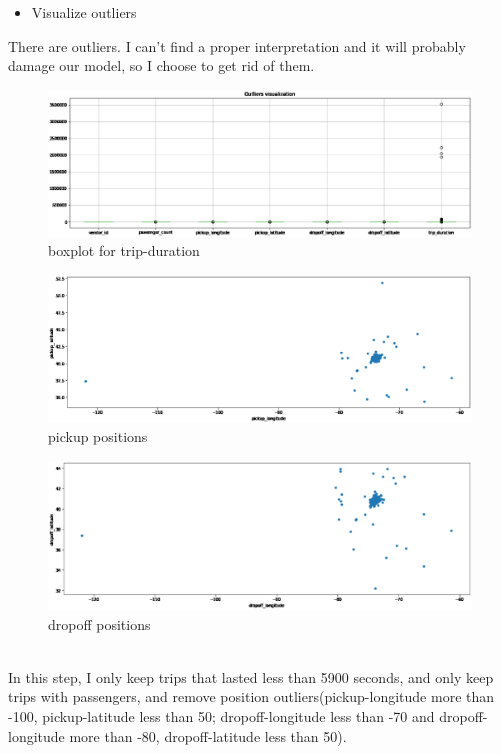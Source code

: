 \begin{itemize}
\item Visualize outliers
\end{itemize}
There are outliers. I can’t find a proper interpretation and it will probably damage our model, so I choose to get rid of them.
\begin{figure}[h]
	\centering
	\includegraphics[scale=0.3]{outliers1.eps}
	\caption{boxplot for trip-duration}
\end{figure}
\begin{figure}[h]
	\centering
	\includegraphics[scale=0.3]{outliers2.eps}
	\caption{pickup positions}
\end{figure}
\begin{figure}[h]
	\centering
	\includegraphics[scale=0.3]{outliers3.eps}
	\caption{dropoff positions}
\end{figure}
\vspace{5cm}\\
In this step, I only keep trips that lasted less than 5900 seconds, and only keep trips with passengers, and remove position outliers(pickup-longitude more than -100, pickup-latitude less than 50; dropoff-longitude less than -70 and dropoff-longitude more than -80, dropoff-latitude less than 50).
%
%



